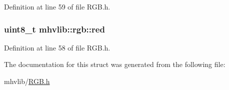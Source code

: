 Definition at line 59 of file R\-G\-B.\-h.

\hypertarget{structmhvlib_1_1rgb_a1c8fd700cae854135cf12271347eabbf}{
\subsubsection[{red}]{\setlength{\rightskip}{0pt plus 5cm}uint8\-\_\-t mhvlib\-::rgb\-::red}}\label{structmhvlib_1_1rgb_a1c8fd700cae854135cf12271347eabbf}


Definition at line 58 of file R\-G\-B.\-h.



The documentation for this struct was generated from the following file\-:\begin{DoxyCompactItemize}
\item 
mhvlib/\hyperlink{_r_g_b_8h}{R\-G\-B.\-h}\end{DoxyCompactItemize}
